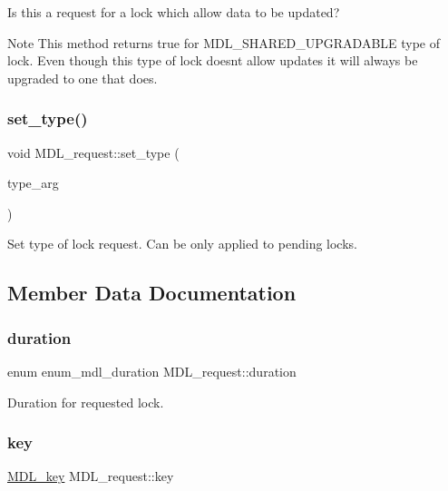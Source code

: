 Is this a request for a lock which allow data to be updated?

\begin{DoxyNote}{Note}
This method returns true for M\+D\+L\+\_\+\+S\+H\+A\+R\+E\+D\+\_\+\+U\+P\+G\+R\+A\+D\+A\+B\+LE type of lock. Even though this type of lock doesn\textquotesingle{}t allow updates it will always be upgraded to one that does. 
\end{DoxyNote}
\mbox{\label{classMDL__request_a6cc77971b2b370098d3e6d89f816180e}} 
\subsubsection{\texorpdfstring{set\+\_\+type()}{set\_type()}}
{\footnotesize\ttfamily void M\+D\+L\+\_\+request\+::set\+\_\+type (\begin{DoxyParamCaption}\item[{enum\+\_\+mdl\+\_\+type}]{type\+\_\+arg }\end{DoxyParamCaption})\hspace{0.3cm}{\ttfamily [inline]}}

Set type of lock request. Can be only applied to pending locks. 

\subsection{Member Data Documentation}
\mbox{\label{classMDL__request_a1bbba71916cc45c7a3912175ef76cf69}} 
\subsubsection{\texorpdfstring{duration}{duration}}
{\footnotesize\ttfamily enum enum\+\_\+mdl\+\_\+duration M\+D\+L\+\_\+request\+::duration}

Duration for requested lock. \mbox{\label{classMDL__request_ab30e06e36d9191120575cc0c0402554a}} 
\subsubsection{\texorpdfstring{key}{key}}
{\footnotesize\ttfamily \mbox{\hyperlink{structMDL__key}{M\+D\+L\+\_\+key}} M\+D\+L\+\_\+request\+::key}

